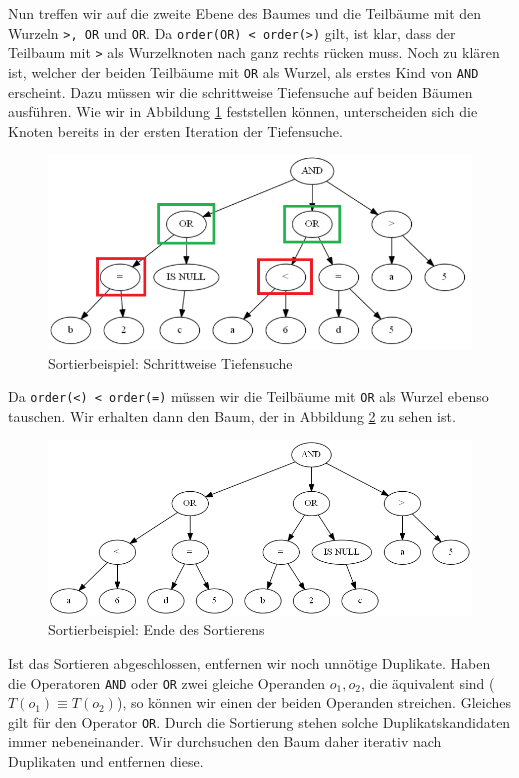 Nun treffen wir auf die zweite Ebene des Baumes und die Teilbäume mit den Wurzeln \verb|>, OR| und \verb|OR|. Da \verb|order(OR) < order(>)| gilt, ist klar, dass der Teilbaum mit \verb|>| als Wurzelknoten nach ganz rechts rücken muss. Noch zu klären ist, welcher der beiden Teilbäume mit \verb|OR| als Wurzel, als erstes Kind von \verb|AND| erscheint. Dazu müssen wir die schrittweise Tiefensuche auf beiden Bäumen ausführen. Wie wir in Abbildung \ref{fig:sort_step2} feststellen können, unterscheiden sich die Knoten bereits in der ersten Iteration der Tiefensuche.

\begin{figure}[H]
\centering
\includegraphics[scale=0.55]{Bilder/sort_step2.png}
\caption{Sortierbeispiel: Schrittweise Tiefensuche}
\label{fig:sort_step2}
\end{figure}

 Da \verb|order(<) < order(=)| müssen wir die Teilbäume mit \verb|OR| als Wurzel ebenso tauschen. Wir erhalten dann den Baum, der in Abbildung \ref{fig:sort_zwischen4} zu sehen ist.

\begin{figure}[H]
\centering
\includegraphics[scale=0.55]{Bilder/sort_zwischen4.png}
\caption{Sortierbeispiel: Ende des Sortierens}
\label{fig:sort_zwischen4}
\end{figure}

Ist das Sortieren abgeschlossen, entfernen wir noch unnötige Duplikate. Haben die Operatoren \verb|AND| oder \verb|OR| zwei gleiche Operanden $o_1,o_2$, die äquivalent sind ($T(o_1) \equiv T(o_2)$), so können wir einen der beiden Operanden streichen. Gleiches gilt für den Operator \verb|OR|. Durch die Sortierung stehen solche Duplikatskandidaten immer nebeneinander. Wir durchsuchen den Baum daher iterativ nach Duplikaten und entfernen diese.

